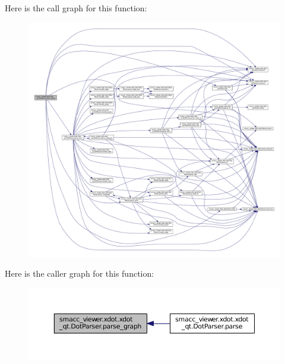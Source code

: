 Here is the call graph for this function\+:
\nopagebreak
\begin{figure}[H]
\begin{center}
\leavevmode
\includegraphics[width=350pt]{classsmacc__viewer_1_1xdot_1_1xdot__qt_1_1DotParser_a5465e71c4bf4a6de15f014b1d27855fb_cgraph}
\end{center}
\end{figure}




Here is the caller graph for this function\+:
\nopagebreak
\begin{figure}[H]
\begin{center}
\leavevmode
\includegraphics[width=350pt]{classsmacc__viewer_1_1xdot_1_1xdot__qt_1_1DotParser_a5465e71c4bf4a6de15f014b1d27855fb_icgraph}
\end{center}
\end{figure}


